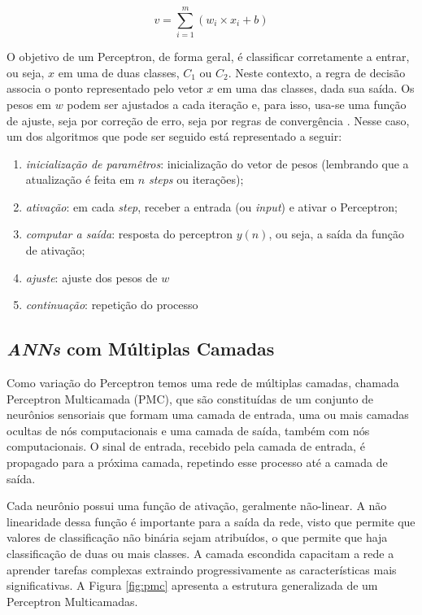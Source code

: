 \begin{equation}
v = \sum_{i=1}^{m} ({w_i} \times {x_i} + b)
\label{eq:funcperceptron}
\end{equation}

O objetivo de um Perceptron, de forma geral, é classificar corretamente a entrar, ou seja, $x$ em uma de duas classes, $C_1$ ou $C_2$. Neste contexto, a regra de decisão associa o ponto representado pelo vetor $x$ em uma das classes, dada sua saída. Os pesos em $w$ podem ser ajustados a cada iteração e, para isso, usa-se uma função de ajuste, seja por correção de erro, seja por regras de convergência \cite{Haykin2nd-136}. Nesse caso, um dos algoritmos que pode ser seguido está representado a seguir:
\begin{enumerate}
	\item \textit{inicialização de paramêtros}: inicialização do vetor de pesos (lembrando que a atualização é feita em $n$ \textit{steps} ou iterações);
	\item \textit{ativação}: em cada \textit{step}, receber a entrada (ou \textit{input}) e ativar o Perceptron;
	\item \textit{computar a saída}: resposta do perceptron $y(n)$, ou seja, a saída da função de ativação;
	\item \textit{ajuste}: ajuste dos pesos de $w$ 
	\item \textit{continuação}: repetição do processo	 
\end{enumerate}

\subsection{\textit{ANNs} com Múltiplas Camadas}



Como variação do Perceptron temos uma rede de múltiplas camadas, chamada Perceptron Multicamada (PMC), que são constituídas de um conjunto de neurônios sensoriais que formam uma camada de entrada, uma ou mais camadas ocultas de nós computacionais e uma camada de saída, também com nós computacionais. O sinal de entrada, recebido pela camada de entrada, é propagado para a próxima camada, repetindo esse processo até a camada de saída\cite{Haykin98p93}. 

Cada neurônio possui uma função de ativação, geralmente não-linear. A não linearidade dessa função é importante para a saída da rede, visto que permite que valores de classificação não binária sejam atribuídos, o que permite que haja classificação de duas ou mais classes. A camada escondida capacitam a rede a aprender tarefas complexas extraindo progressivamente as características mais significativas. A Figura \ref{fig:pmc} apresenta a estrutura generalizada de um Perceptron Multicamadas. 

